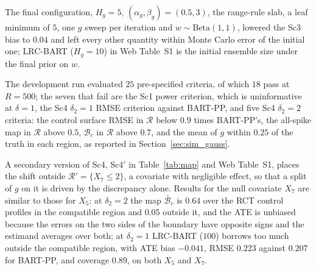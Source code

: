 \documentclass[11pt]{article}
\theoremstyle{definition}
\theoremstyle{plain}
\begin{document}
The final configuration, $H_g=5$, $(\alpha_g,\beta_g)=(0.5,3)$, the range-rule slab, a leaf minimum of $5$, one $g$ sweep per iteration and $w\sim\mathrm{Beta}(1,1)$, lowered the Sc3 bias to $0.04$ and left every other quantity within Monte Carlo error of the initial one; LRC-BART ($H_g=10$) in Web Table~S1 is the initial ensemble size under the final prior on $w$.

The development run evaluated $25$ pre-specified criteria, of which $18$ pass at $R=500$; the seven that fail are the Sc1 power criterion, which is uninformative at $\delta=1$, the Sc4 $\delta_2=1$ RMSE criterion against BART-PP, and five Sc4 $\delta_2=2$ criteria: the control surface RMSE in $\mathcal R$ below $0.9$ times BART-PP's, the all-spike map in $\mathcal R$ above $0.5$, $\mathcal B_c$ in $\mathcal R$ above $0.7$, and the mean of $g$ within $0.25$ of the truth in each region, as reported in Section~\ref{sec:sim_gauss}.

A secondary version of Sc4, Sc4$'$ in Table~\ref{tab:map} and Web Table~S1, places the shift outside $\mathcal R'=\{X_7\le2\}$, a covariate with negligible effect, so that a split of $g$ on it is driven by the discrepancy alone. Results for the null covariate $X_7$ are similar to those for $X_5$: at $\delta_2=2$ the map $\bar{\mathcal B}_c$ is $0.64$ over the RCT control profiles in the compatible region and $0.05$ outside it, and the ATE is unbiased because the errors on the two sides of the boundary have opposite signs and the estimand averages over both; at $\delta_2=1$ LRC-BART ($100$) borrows too much outside the compatible region, with ATE bias $-0.041$, RMSE $0.223$ against $0.207$ for BART-PP, and coverage $0.89$, on both $X_5$ and $X_7$.
\end{document}
